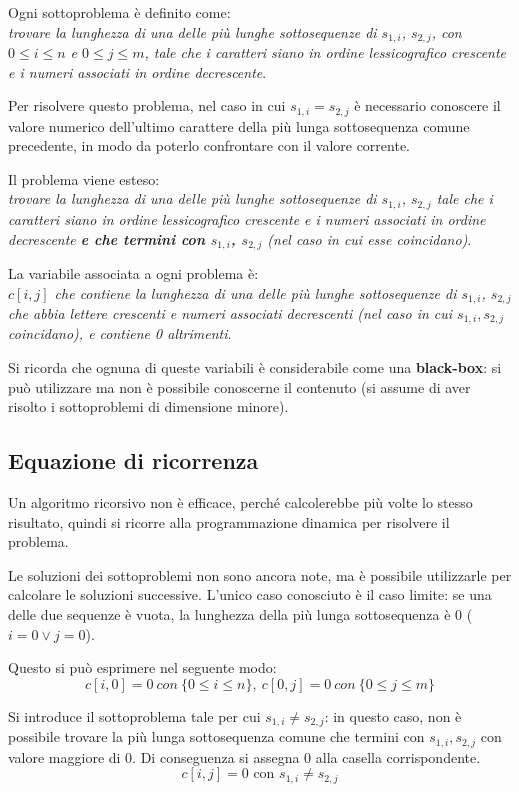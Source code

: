 \documentclass{article}
\begin{document}
Ogni sottoproblema è definito come: \\
\textit{trovare la lunghezza di una delle più lunghe sottosequenze di $s_{1, i}$, $s_{2, j}$, con $0 \leq i \leq n$ e $0 \leq j \leq m$, tale che i caratteri siano in ordine lessicografico crescente e i numeri associati in ordine decrescente}.
	
Per risolvere questo problema, nel caso in cui $s_{1, i} = s_{2, j}$ è necessario conoscere il valore numerico dell'ultimo carattere della più lunga sottosequenza comune precedente, in modo da poterlo confrontare con il valore corrente.

Il problema viene esteso: \\
\textit{trovare la lunghezza di una delle più lunghe sottosequenze di $s_{1, i}$, $s_{2, j}$ tale che i caratteri siano in ordine lessicografico crescente e i numeri associati in ordine decrescente \textbf{e che termini con $s_{1, i}$, $s_{2, j}$} (nel caso in cui esse coincidano)}.

La variabile associata a ogni problema è: \\
\textit{$c[i, j]$ che contiene la lunghezza di una delle più lunghe sottosequenze di $s_{1, i}$, $s_{2, j}$ che abbia lettere crescenti e numeri associati decrescenti (nel caso in cui $s_{1, i}, s_{2, j}$ coincidano), e contiene 0 altrimenti}.

Si ricorda che ognuna di queste variabili è considerabile come una \textbf{black-box}: si può utilizzare ma non è possibile conoscerne il contenuto (si assume di aver risolto i sottoproblemi di dimensione minore).
	
\subsection{Equazione di ricorrenza}
Un algoritmo ricorsivo non è efficace, perché calcolerebbe più volte lo stesso risultato, quindi si ricorre alla programmazione dinamica per risolvere il problema.

Le soluzioni dei sottoproblemi non sono ancora note, ma è possibile utilizzarle per calcolare le soluzioni successive. L'unico caso conosciuto è il caso limite: se una delle due sequenze è vuota, la lunghezza della più lunga sottosequenza è 0 ($i = 0 \lor j = 0$).

Questo si può esprimere nel seguente modo:
$$c[i, 0] = 0\ con\ \{0 \leq i \leq n\},\ c[0, j] = 0\ con\ \{0 \leq j \leq m\}$$

Si introduce il sottoproblema tale per cui $s_{1, i} \neq s_{2, j}$: in questo caso, non è possibile trovare la più lunga sottosequenza comune che termini con $s_{1, i}, s_{2, j}$ con valore maggiore di 0. Di conseguenza si assegna 0 alla casella corrispondente.
$$c[i, j] = 0 \text{ con } s_{1, i} \neq s_{2, j}$$
\end{document}
